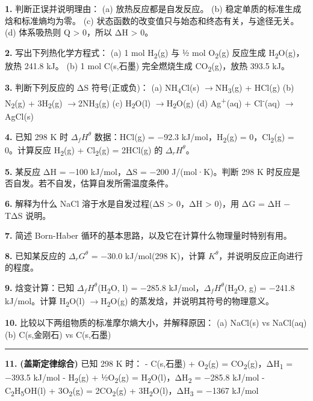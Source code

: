 \documentclass[a4paper,11pt]{ctexart}
\newcommand{\箭}{\ensuremath{\rightarrow}}
\newcommand{\左箭}{\ensuremath{\leftarrow}}
\newcommand{\上箭}{\ensuremath{\uparrow}}
\newcommand{\下箭}{\ensuremath{\downarrow}}
\newcommand{\衡}{\ensuremath{\rightleftharpoons}}
\newcommand{\双箭}{\ensuremath{\leftrightarrow}}
\newcommand{\约等于}{\ensuremath{\approx}}
\newcommand{\小于等于}{\ensuremath{\leq}}
\newcommand{\大于等于}{\ensuremath{\geq}}
\newcommand{\不等于}{\ensuremath{\neq}}
\newcommand{\西格马}{\ensuremath{\sigma}}
\newcommand{\派}{\ensuremath{\pi}}
\begin{document}
\textbf{1.} 判断正误并说明理由：
(a) 放热反应都是自发反应。
(b) 稳定单质的标准生成焓和标准熵均为零。
(c) 状态函数的改变值只与始态和终态有关，与途径无关。
(d) 体系吸热则 Q \textgreater{} 0，所以 ΔH \textgreater{} 0。

\textbf{2.} 写出下列热化学方程式：
(a) 1 mol H\textsubscript{2}(g) 与 ½ mol O\textsubscript{2}(g) 反应生成 H\textsubscript{2}O(g)，放热 241.8 kJ。
(b) 1 mol C(s,石墨) 完全燃烧生成 CO\textsubscript{2}(g)，放热 393.5 kJ。

\textbf{3.} 判断下列反应的 ΔS 符号(正或负)：
(a) NH\textsubscript{4}Cl(s) \箭 NH\textsubscript{3}(g) + HCl(g)
(b) N\textsubscript{2}(g) + 3H\textsubscript{2}(g) \箭 2NH\textsubscript{3}(g)
(c) H\textsubscript{2}O(l) \箭 H\textsubscript{2}O(g)
(d) Ag\textsuperscript{+}(aq) + Cl\textsuperscript{-}(aq) \箭 AgCl(s)

\textbf{4.} 已知 298 K 时 \(\Delta_f H^\theta\) 数据：HCl(g) = −92.3 kJ/mol，H\textsubscript{2}(g) = 0，Cl\textsubscript{2}(g) = 0。计算反应 H\textsubscript{2}(g) + Cl\textsubscript{2}(g) = 2HCl(g) 的 \(\Delta_r H^\theta\)。

\textbf{5.} 某反应 ΔH = −100 kJ/mol，ΔS = −200 J/(mol·K)。判断 298 K 时反应是否自发。若不自发，估算自发所需温度条件。

\textbf{6.} 解释为什么 NaCl 溶于水是自发过程(ΔS \textgreater{} 0，ΔH \textgreater{} 0)，用 ΔG = ΔH − TΔS 说明。

\textbf{7.} 简述 Born-Haber 循环的基本思路，以及它在计算什么物理量时特别有用。

\textbf{8.} 已知某反应的 \(\Delta_r G^\theta\) = −30.0 kJ/mol(298 K)，计算 \(K^\theta\)，并说明反应正向进行的程度。

\textbf{9.} 焓变计算：已知 \(\Delta_f H^\theta\)(H\textsubscript{2}O, l) = −285.8 kJ/mol，\(\Delta_f H^\theta\)(H\textsubscript{2}O, g) = −241.8 kJ/mol。计算 H\textsubscript{2}O(l) \箭 H\textsubscript{2}O(g) 的蒸发焓，并说明其符号的物理意义。

\textbf{10.} 比较以下两组物质的标准摩尔熵大小，并解释原因：
(a) NaCl(s) vs NaCl(aq)
(b) C(s,金刚石) vs C(s,石墨)

\begin{center}\rule{0.5\linewidth}{0.5pt}\end{center}

\textbf{11.} \textbf{(盖斯定律综合)} 已知 298 K 时：
- C(s,石墨) + O\textsubscript{2}(g) = CO\textsubscript{2}(g)，ΔH\textsubscript{1} = −393.5 kJ/mol
- H\textsubscript{2}(g) + ½O\textsubscript{2}(g) = H\textsubscript{2}O(l)，ΔH\textsubscript{2} = −285.8 kJ/mol
- C\textsubscript{2}H\textsubscript{5}OH(l) + 3O\textsubscript{2}(g) = 2CO\textsubscript{2}(g) + 3H\textsubscript{2}O(l)，ΔH\textsubscript{3} = −1367 kJ/mol
\end{document}

